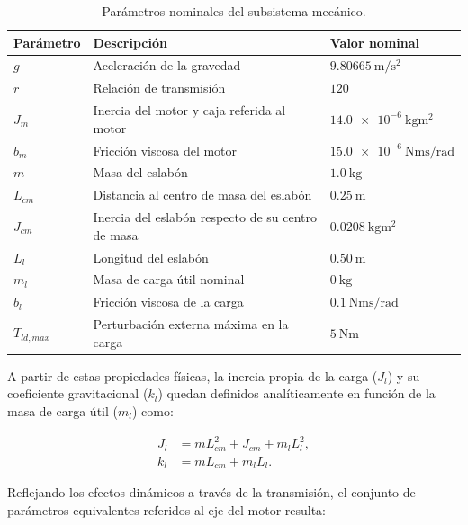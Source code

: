 \documentclass[10pt,a4paper]{article}
\begin{document}
\begin{table}[H]
    \centering
    \caption{Parámetros nominales del subsistema mecánico.}
    \label{tab:parametros_mecanicos}
    \begin{tabular}{lll}
        \toprule
        Parámetro & Descripción & Valor nominal \\
        \midrule
        $g$ & Aceleración de la gravedad & \(\SI{9.80665}{\meter\per\second\squared}\) \\
        $r$ & Relación de transmisión & \(120\) \\
        $J_m$ & Inercia del motor y caja referida al motor & \(\SI{14.0e-6}{\kilogram\meter\squared}\) \\
        $b_m$ & Fricción viscosa del motor & \(\SI{15.0e-6}{\newton\meter\second\per\radian}\) \\
        $m$ & Masa del eslabón & \(\SI{1.0}{\kilogram}\) \\
        $L_{cm}$ & Distancia al centro de masa del eslabón & \(\SI{0.25}{\meter}\) \\
        $J_{cm}$ & Inercia del eslabón respecto de su centro de masa & \(\SI{0.0208}{\kilogram\meter\squared}\) \\
        $L_l$ & Longitud del eslabón & \(\SI{0.50}{\meter}\) \\
        $m_l$ & Masa de carga útil nominal & \(\SI{0}{\kilogram}\) \\
        $b_l$ & Fricción viscosa de la carga & \(\SI{0.1}{\newton\meter\second\per\radian}\) \\
        $T_{ld,max}$ & Perturbación externa máxima en la carga & \(\SI{5}{\newton\meter}\) \\
        \bottomrule
    \end{tabular}
\end{table}

A partir de estas propiedades físicas, la inercia propia de la carga ($J_l$) y su coeficiente gravitacional ($k_l$) 
quedan definidos analíticamente en función de la masa de carga útil ($m_l$) como:

\begin{equation*}
    \begin{aligned}
        J_l &= m L_{cm}^{2} + J_{cm} + m_l L_l^{2}, \\
        k_l &= m L_{cm} + m_l L_l.
    \end{aligned}
\end{equation*}

Reflejando los efectos dinámicos a través de la transmisión, el conjunto de parámetros equivalentes referidos al eje del motor resulta:
\end{document}
